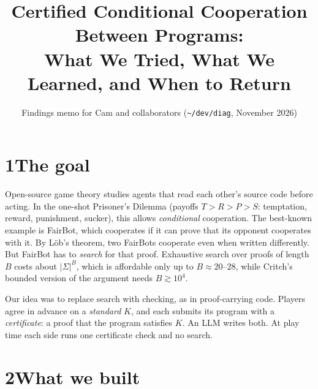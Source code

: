 \documentclass[11pt]{article}
\title{\vspace{-1.5em}Certified Conditional Cooperation Between Programs:\\ What We Tried, What We Learned, and When to Return}
\author{Findings memo for Cam and collaborators \quad (\texttt{\~{}/dev/diag}, November 2026)}
\date{\vspace{-2.5em}}
\begin{document}
\maketitle

\begin{center}
\end{center}

\section*{1\quad The goal}

Open-source game theory studies agents that read each other's source code before acting. In the one-shot Prisoner's Dilemma (payoffs $T > R > P > S$: temptation, reward, punishment, sucker), this allows \emph{conditional} cooperation. The best-known example is FairBot, which cooperates if it can prove that its opponent cooperates with it. By Löb's theorem, two FairBots cooperate even when written differently. But FairBot has to \emph{search} for that proof. Exhaustive search over proofs of length $B$ costs about $|\Sigma|^B$, which is affordable only up to $B \approx 20$--$28$, while Critch's bounded version of the argument needs $B \gtrsim 10^4$.

Our idea was to replace search with checking, as in proof-carrying code. Players agree in advance on a \emph{standard} $K$, and each submits its program with a \emph{certificate}: a proof that the program satisfies $K$. An LLM writes both. At play time each side runs one certificate check and no search.

\section*{2\quad What we built}
\end{document}

